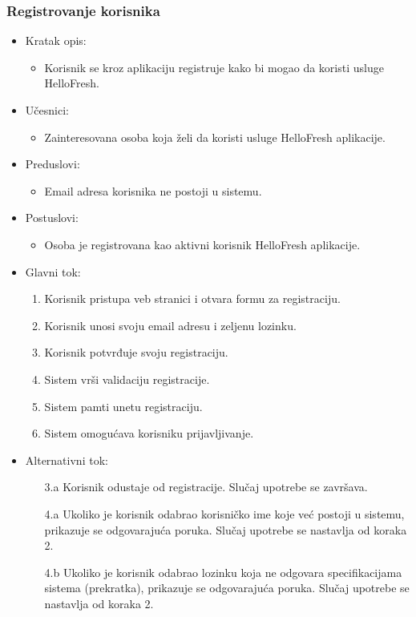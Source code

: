 \subsubsection{Registrovanje korisnika}

\begin{itemize}
    \item Kratak opis:
        \begin{itemize}
            \item Korisnik se kroz aplikaciju registruje kako bi mogao da koristi usluge HelloFresh.
        \end{itemize}
    \item Učesnici:
        \begin{itemize}
            \item Zainteresovana osoba koja želi da koristi usluge HelloFresh aplikacije.
        \end{itemize}
    \item Preduslovi:
        \begin{itemize}
            \item Email adresa korisnika ne postoji u sistemu.
        \end{itemize}
    \item Postuslovi:
        \begin{itemize}
            \item Osoba je registrovana kao aktivni korisnik HelloFresh aplikacije.
        \end{itemize}
    \item Glavni tok:
        \begin{enumerate}
            \item Korisnik pristupa veb stranici i otvara formu za registraciju.
            \item Korisnik unosi svoju email adresu i zeljenu lozinku.
            \item Korisnik potvrđuje svoju registraciju.
            \item Sistem vrši validaciju registracije.
            \item Sistem pamti unetu registraciju.
            \item Sistem omogućava korisniku prijavljivanje.
        \end{enumerate}
    \item Alternativni tok:
        \begin{itemize}
            \item[3.a] Korisnik odustaje od registracije. Slučaj upotrebe se završava.
            \item[4.a] Ukoliko je korisnik odabrao korisničko ime koje već postoji u sistemu, prikazuje se odgovarajuća poruka. Slučaj upotrebe se nastavlja od koraka 2.
            \item[4.b] Ukoliko je korisnik odabrao lozinku koja ne odgovara specifikacijama sistema (prekratka), prikazuje se odgovarajuća poruka. Slučaj upotrebe se nastavlja od koraka 2.
        \end{itemize}
\end{itemize}
